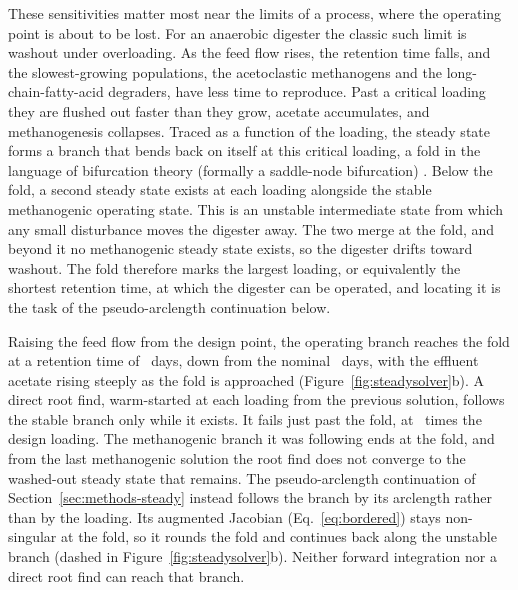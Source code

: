 \documentclass{article}
\begin{document}
These sensitivities matter most near the limits of a process, where the operating point is about to be lost. For an anaerobic digester the classic such limit is washout under overloading. As the feed flow rises, the retention time falls, and the slowest-growing populations, the acetoclastic methanogens and the long-chain-fatty-acid degraders, have less time to reproduce. Past a critical loading they are flushed out faster than they grow, acetate accumulates, and methanogenesis collapses. Traced as a function of the loading, the steady state forms a branch that bends back on itself at this critical loading, a fold in the language of bifurcation theory (formally a saddle-node bifurcation) \citep{seydel2010}. Below the fold, a second steady state exists at each loading alongside the stable methanogenic operating state. This is an unstable intermediate state from which any small disturbance moves the digester away. The two merge at the fold, and beyond it no methanogenic steady state exists, so the digester drifts toward washout. The fold therefore marks the largest loading, or equivalently the shortest retention time, at which the digester can be operated, and locating it is the task of the pseudo-arclength continuation below.

Raising the feed flow from the design point, the operating branch reaches the fold at a retention time of \SteadyFoldSRT~days, down from the nominal \SteadySRTnominal~days, with the effluent acetate rising steeply as the fold is approached (Figure~\ref{fig:steadysolver}b). A direct root find, warm-started at each loading from the previous solution, follows the stable branch only while it exists. It fails just past the fold, at \SteadyFoldFailDil\ times the design loading. The methanogenic branch it was following ends at the fold, and from the last methanogenic solution the root find does not converge to the washed-out steady state that remains. The pseudo-arclength continuation of Section~\ref{sec:methods-steady} instead follows the branch by its arclength rather than by the loading. Its augmented Jacobian (Eq.~\eqref{eq:bordered}) stays non-singular at the fold, so it rounds the fold and continues back along the unstable branch (dashed in Figure~\ref{fig:steadysolver}b). Neither forward integration nor a direct root find can reach that branch.
\end{document}
